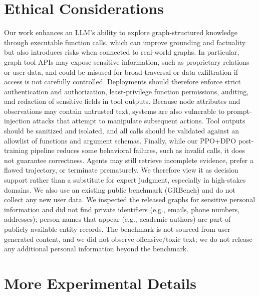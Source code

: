 \documentclass[11pt]{article}
\begin{document}
\section*{Ethical Considerations}
Our work enhances an LLM's ability to explore graph-structured knowledge through executable function calls, which can improve grounding and factuality but also introduces risks when connected to real-world graphs. In particular, graph tool APIs may expose sensitive information, such as proprietary relations or user data, and could be misused for broad traversal or data exfiltration if access is not carefully controlled. Deployments should therefore enforce strict authentication and authorization, least-privilege function permissions, auditing, and redaction of sensitive fields in tool outputs. Because node attributes and observations may contain untrusted text, systems are also vulnerable to prompt-injection attacks that attempt to manipulate subsequent actions. Tool outputs should be sanitized and isolated, and all calls should be validated against an allowlist of functions and argument schemas. Finally, while our PPO+DPO post-training pipeline reduces some behavioral failures, such as invalid calls, it does not guarantee correctness. Agents may still retrieve incomplete evidence, prefer a flawed trajectory, or terminate prematurely. We therefore view it as decision support rather than a substitute for expert judgment, especially in high-stakes domains. We also use an existing public benchmark (GRBench) and do not collect any new user data. We inspected the released graphs for sensitive personal information and did not find private identifiers (e.g., emails, phone numbers, addresses); person names that appear (e.g., academic authors) are part of publicly available entity records. The benchmark is not sourced from user-generated content, and we did not observe offensive/toxic text; we do not release any additional personal information beyond the benchmark.



\newpage
\appendix
\section{More Experimental Details}
\end{document}

